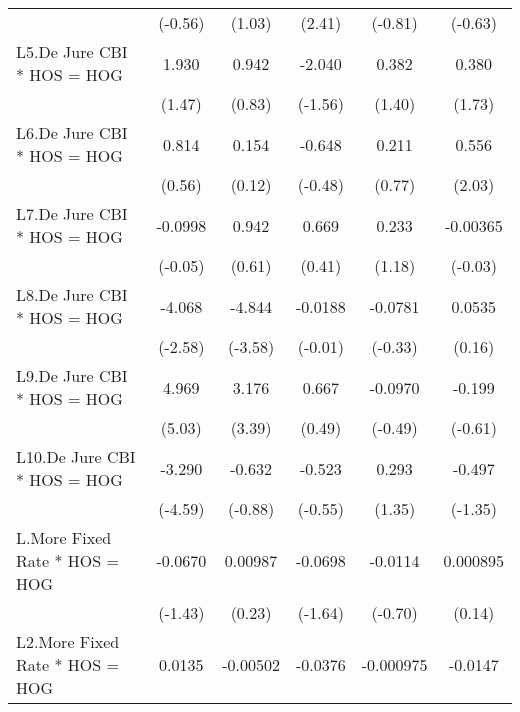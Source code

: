 {\begin{longtable}{l*{5}{c}}
                &  (-0.56)         &   (1.03)         &   (2.41)         &  (-0.81)         &  (-0.63)         \\
[1em]
L5.De Jure CBI * HOS = HOG&    1.930         &    0.942         &   -2.040         &    0.382         &    0.380         \\
                &   (1.47)         &   (0.83)         &  (-1.56)         &   (1.40)         &   (1.73)         \\
[1em]
L6.De Jure CBI * HOS = HOG&    0.814         &    0.154         &   -0.648         &    0.211         &    0.556\sym{*}  \\
                &   (0.56)         &   (0.12)         &  (-0.48)         &   (0.77)         &   (2.03)         \\
[1em]
L7.De Jure CBI * HOS = HOG&  -0.0998         &    0.942         &    0.669         &    0.233         & -0.00365         \\
                &  (-0.05)         &   (0.61)         &   (0.41)         &   (1.18)         &  (-0.03)         \\
[1em]
L8.De Jure CBI * HOS = HOG&   -4.068\sym{*}  &   -4.844\sym{***}&  -0.0188         &  -0.0781         &   0.0535         \\
                &  (-2.58)         &  (-3.58)         &  (-0.01)         &  (-0.33)         &   (0.16)         \\
[1em]
L9.De Jure CBI * HOS = HOG&    4.969\sym{***}&    3.176\sym{***}&    0.667         &  -0.0970         &   -0.199         \\
                &   (5.03)         &   (3.39)         &   (0.49)         &  (-0.49)         &  (-0.61)         \\
[1em]
L10.De Jure CBI * HOS = HOG&   -3.290\sym{***}&   -0.632         &   -0.523         &    0.293         &   -0.497         \\
                &  (-4.59)         &  (-0.88)         &  (-0.55)         &   (1.35)         &  (-1.35)         \\
[1em]
L.More Fixed Rate * HOS = HOG&  -0.0670         &  0.00987         &  -0.0698         &  -0.0114         & 0.000895         \\
                &  (-1.43)         &   (0.23)         &  (-1.64)         &  (-0.70)         &   (0.14)         \\
[1em]
L2.More Fixed Rate * HOS = HOG&   0.0135         & -0.00502         &  -0.0376         &-0.000975         &  -0.0147\sym{*}  \\

\end{longtable}}

